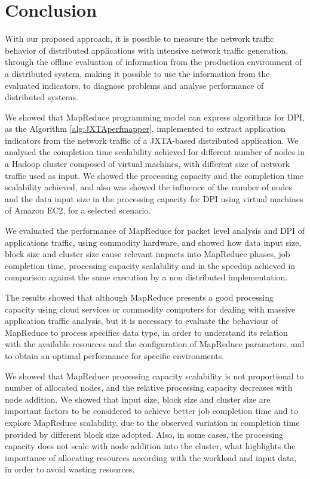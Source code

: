 \section{Conclusion}
\label{sc:conc_conclusion}

With our proposed approach, it is possible to measure the network traffic behavior of distributed applications with intensive network traffic generation, through the offline evaluation of information from the production environment of a distributed system, making it possible to use the information from the evaluated indicators, to diagnose problems and analyse performance of distributed systems.

We showed that MapReduce programming model can express algorithms for DPI, as the Algorithm \ref{alg:JXTAperfmapper}, implemented to extract application indicators from the network traffic of a JXTA-based distributed application. We analysed the completion time scalability achieved for different number of nodes in a Hadoop cluster composed of virtual machines, with different size of network traffic used as input. We showed the processing capacity and the completion time scalability achieved, and also was showed the influence of the number of nodes and the data input size in the processing capacity for DPI using virtual machines of Amazon EC2, for a selected scenario.

We evaluated the performance of MapReduce for packet level analysis and DPI of applications traffic, using commodity hardware, and showed how data input size, block size and cluster size cause relevant impacts into MapReduce phases, job completion time, processing capacity scalability and in the speedup achieved in comparison against the same execution by a non distributed implementation.

The results showed that although MapReduce presents a good processing capacity using cloud services or commodity computers for dealing with massive application traffic analysis, but it is necessary to evaluate the behaviour of MapReduce to process specifics data type, in order to understand its relation with the available resources and the configuration of MapReduce parameters, and to obtain an optimal performance for specific environments.

We showed that MapReduce processing capacity scalability is not proportional to number of allocated nodes, and the relative processing capacity decreases with node addition. We showed that input size, block size and cluster size are important factors to be considered to achieve better job completion time and to explore MapReduce scalability, due to the observed variation in completion time provided by different block size adopted. Also, in some cases, the processing capacity does not scale with node addition into the cluster, what highlights the importance of allocating resources according with the workload and input data, in order to avoid wasting resources.

